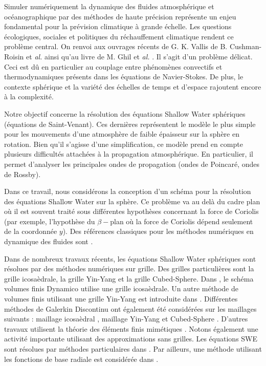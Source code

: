 Simuler numériquement la dynamique des fluides atmosphérique et océanographique par des méthodes de haute précision représente un enjeu fondamental pour la prévision climatique à grande échelle. 
Les questions écologiques, sociales et politiques du réchauffement climatique rendent ce problème central. On renvoi aux ouvrages récents de G. K. Vallis \cite{Vallis2017} de B. Cushman-Roisin et \textit{al.} \cite{Cushman2011} ainsi qu'au livre de M. Ghil et \textit{al.} \cite{Ghil1987}. Il s'agit d'un problème délicat. Ceci est dû en particulier au couplage entre phénomènes convectifs et thermodynamiques présents dans les équations de Navier-Stokes. De plus, le contexte sphérique et la variété des échelles de temps et d'espace rajoutent encore à la complexité.

Notre objectif concerne la résolution des équations Shallow Water sphériques (équations de Saint-Venant). Ces dernières représentent le modèle le plus simple pour les mouvements d'une atmosphère de faible épaisseur sur la sphère en rotation. Bien qu'il s'agisse d'une simplification, ce modèle prend en compte plusieurs difficultés attachées à la propagation atmosphérique. En particulier, il permet d'analyser les principales ondes de propagation (ondes de Poincaré, ondes de Rossby).

Dans ce travail, nous considérons la conception d'un schéma pour la résolution des équations Shallow Water sur la sphère. Ce problème va au delà du cadre plan où il est souvent traité sous différentes hypothèses concernant la force de Coriolis (par exemple, l'hypothèse du $\beta-$plan où la force de Coriolis dépend seulement de la coordonnée $y$). Des références classiques pour les méthodes numériques en dynamique des fluides sont \cite{Augenbaum1985, Durran2013, Zeitlin2007}. 

Dans de nombreux travaux récents, les équations Shallow Water sphériques sont résolues par des méthodes numériques sur grille. Des grilles particulières sont la grille icosaèdrale, la grille Yin-Yang et la grille Cubed-Sphere. Dans \cite{Thuburn2014}, le schéma volumes finis Dynamico utilise une grille icosaèdrale. Un autre méthode de volumes finis utilisant une grille Yin-Yang est introduite dans \cite{Li2008}. Différentes méthodes de Galerkin Discontinu ont également été considérées sur les maillages suivants : maillage icosaèdral \cite{Giraldo2002}, maillage Yin-Yang \cite{Hall2013} et Cubed-Sphere \cite{Lauter2008, Nair2005}. D'autres travaux utilisent la théorie des éléments finis mimétiques \cite{Eldred2015}. Notons également une activité importante utilisant des approximations sans grilles. Les équations SWE sont résolues par méthodes particulaires dans \cite{Bosler2014}. Par ailleurs, une méthode utilisant les fonctions de base radiale est considérée dans \cite{Flyer2011, Fornberg2008}.  

